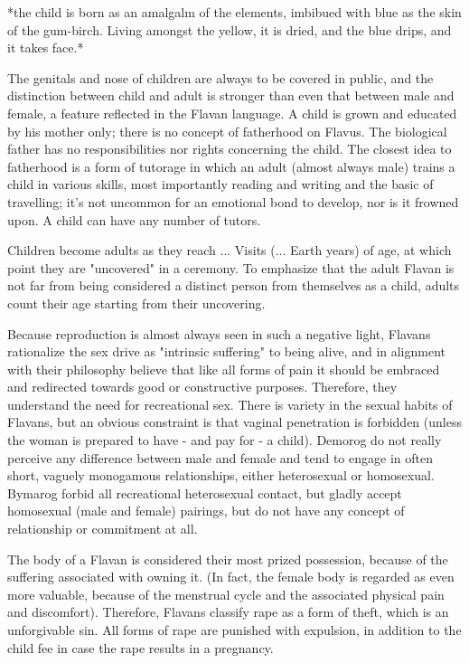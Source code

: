 \documentclass[10pt,oneside]{memoir}
\begin{document}
*the child is born as an amalgalm of the elements, imbibued with blue as the skin of the gum-birch. Living amongst the yellow, it is dried, and the blue drips, and it takes face.*

The genitals and nose of children are always to be covered in public, and the distinction between child and adult is stronger than even that between male and female, a feature reflected in the Flavan language. A child is grown and educated by his mother only; there is no concept of fatherhood on Flavus. The biological father has no responsibilities nor rights concerning the child. The closest idea to fatherhood is a form of tutorage in which an adult (almost always male) trains a child in various skills, most importantly reading and writing and the basic of travelling; it's not uncommon for an emotional bond to develop, nor is it frowned upon. A child can have any number of tutors.

Children become adults as they reach ... Visits (... Earth years) of age, at which point they are "uncovered" in a ceremony. To emphasize that the adult Flavan is not far from being considered a distinct person from themselves as a child, adults count their age starting from their uncovering.

Because reproduction is almost always seen in such a negative light, Flavans rationalize the sex drive as "intrinsic suffering" to being alive, and in alignment with their philosophy believe that like all forms of pain it should be embraced and redirected towards good or constructive purposes. Therefore, they understand the need for recreational sex. There is variety in the sexual habits of Flavans, but an obvious constraint is that vaginal penetration is forbidden (unless the woman is prepared to have - and pay for - a child). Demorog do not really perceive any difference between male and female and tend to engage in often short, vaguely monogamous relationships, either heterosexual or homosexual. Bymarog forbid all recreational heterosexual contact, but gladly accept homosexual (male and female) pairings, but do not have any concept of relationship or commitment at all.

The body of a Flavan is considered their most prized possession, because of the suffering associated with owning it. (In fact, the female body is regarded as even more valuable, because of the menstrual cycle and the associated physical pain and discomfort). Therefore, Flavans classify rape as a form of theft, which is an unforgivable sin. All forms of rape are punished with expulsion, in addition to the child fee in case the rape results in a pregnancy.
\end{document}
